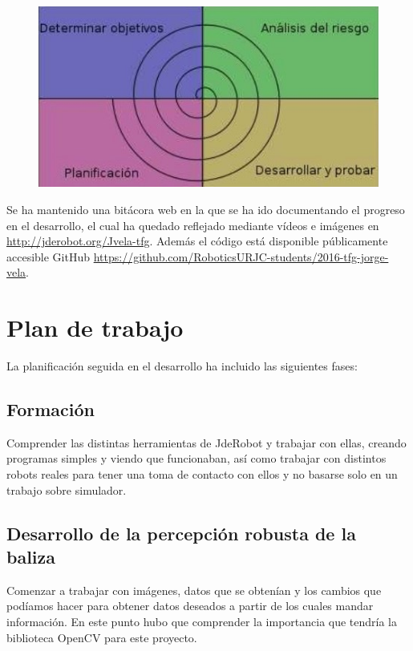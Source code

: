 \begin{figure}[H]
	\centering
		\includegraphics{imgs/metodologia-espiral.jpg}
	\label{fig:Desarrollo en espiral}
\end{figure}

\hspace{1 cm} Se ha mantenido una bit\'acora web en la que se ha ido documentando el progreso en el desarrollo, el cual ha quedado reflejado mediante v\'ideos e im\'agenes en \href{http://jderobot.org/Jvela-tfg}{http://jderobot.org/Jvela-tfg}. Adem\'as el c\'odigo est\'a disponible p\'ublicamente accesible GitHub \href{https://github.com/RoboticsURJC-students/2016-tfg-jorge-vela}{https://github.com/RoboticsURJC-students/2016-tfg-jorge-vela}.

\section{Plan de trabajo}
La planificaci\'on seguida en el desarrollo ha incluido las siguientes fases:

\subsection{Formaci\'on}
\hspace{1 cm} Comprender las distintas herramientas de JdeRobot y trabajar con ellas, creando programas simples y viendo que funcionaban, as\'i como trabajar con distintos robots reales para tener una toma de contacto con ellos y no basarse solo en un trabajo sobre simulador. 

\subsection{Desarrollo de la percepci\'on robusta de la baliza}
\hspace{1 cm} Comenzar a trabajar con im\'agenes, datos que se obten\'ian y los cambios que pod\'iamos hacer para obtener datos deseados a partir de los cuales mandar informaci\'on. En este punto hubo que comprender la importancia que tendr\'ia la biblioteca OpenCV para este proyecto.

